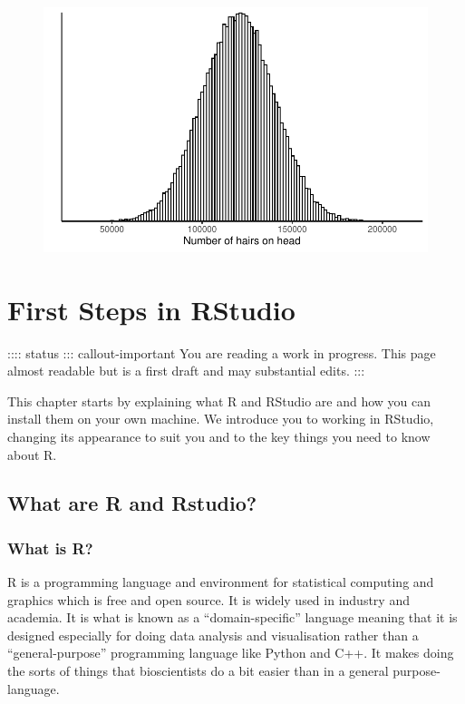 \documentclass[
  letterpaper,
  DIV=11,
  numbers=noendperiod]{scrreprt}
\begin{document}
\begin{figure}[H]

{\centering \includegraphics{ideas_about_data_files/figure-pdf/unnamed-chunk-4-1.pdf}

}

\end{figure}

\hypertarget{first-steps-in-rstudio}{%
\chapter{First Steps in RStudio}\label{first-steps-in-rstudio}}

:::: status ::: callout-important You are reading a work in progress.
This page almost readable but is a first draft and may substantial
edits. :::

This chapter starts by explaining what R and RStudio are and how you can
install them on your own machine. We introduce you to working in
RStudio, changing its appearance to suit you and to the key things you
need to know about R.

\hypertarget{what-are-r-and-rstudio}{%
\section{What are R and Rstudio?}\label{what-are-r-and-rstudio}}

\hypertarget{what-is-r}{%
\subsection{What is R?}\label{what-is-r}}

R is a programming language and environment for statistical computing
and graphics which is free and open source. It is widely used in
industry and academia. It is what is known as a ``domain-specific''
language meaning that it is designed especially for doing data analysis
and visualisation rather than a ``general-purpose'' programming language
like Python and C++. It makes doing the sorts of things that
bioscientists do a bit easier than in a general purpose-language.
\end{document}
